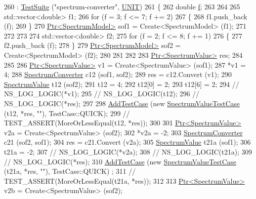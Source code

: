 \begin{DoxyCode}
260   : \hyperlink{classns3_1_1TestSuite_a904b0c40583b744d30908aeb94636d1a}{TestSuite} (\textcolor{stringliteral}{"spectrum-converter"}, \hyperlink{classns3_1_1TestSuite_a1ebfcab34ec8161e085e8e3a1855eae0a3885375a3787abf60431f8454b3cadbd}{UNIT})
261 \{
262   \textcolor{keywordtype}{double} \hyperlink{buildings__pathloss_8m_aa52d3a6e3de5a80a97c12364caeaa125}{f};
263 
264 
265   std::vector<double> f1;
266   \textcolor{keywordflow}{for} (f = 3; f <= 7; f += 2)
267     \{
268       f1.push\_back (f);
269     \}
270   \hyperlink{classns3_1_1Ptr}{Ptr<SpectrumModel>} sof1 = Create<SpectrumModel> (f1);
271 
272 
273 
274   std::vector<double> f2;
275   \textcolor{keywordflow}{for} (f = 2; f <= 8; f += 1)
276     \{
277       f2.push\_back (f);
278     \}
279   \hyperlink{classns3_1_1Ptr}{Ptr<SpectrumModel>} sof2 = Create<SpectrumModel> (f2);
280 
281 
282 
283   \hyperlink{classns3_1_1Ptr}{Ptr<SpectrumValue>} res;
284 
285 
286   \hyperlink{classns3_1_1Ptr}{Ptr<SpectrumValue>} v1 = Create<SpectrumValue> (sof1);
287   *v1 = 4;
288   \hyperlink{classns3_1_1SpectrumConverter}{SpectrumConverter} c12 (sof1, sof2);
289   res = c12.Convert (v1);
290   \hyperlink{classns3_1_1SpectrumValue}{SpectrumValue} t12 (sof2);
291   t12 = 4;
292   t12[0] = 2;
293   t12[6] = 2;
294 \textcolor{comment}{//   NS\_LOG\_LOGIC(*v1);}
295 \textcolor{comment}{//   NS\_LOG\_LOGIC(t12);}
296 \textcolor{comment}{//   NS\_LOG\_LOGIC(*res);}
297 
298   \hyperlink{classns3_1_1TestCase_a3718088e3eefd5d6454569d2e0ddd835}{AddTestCase} (\textcolor{keyword}{new} \hyperlink{classSpectrumValueTestCase}{SpectrumValueTestCase} (t12, *res, \textcolor{stringliteral}{""}), TestCase::QUICK);
299   \textcolor{comment}{// TEST\_ASSERT(MoreOrLessEqual(t12, *res));}
300 
301   \hyperlink{classns3_1_1Ptr}{Ptr<SpectrumValue>} v2a = Create<SpectrumValue> (sof2);
302   *v2a = -2;
303   \hyperlink{classns3_1_1SpectrumConverter}{SpectrumConverter} c21 (sof2, sof1);
304   res = c21.Convert (v2a);
305   \hyperlink{classns3_1_1SpectrumValue}{SpectrumValue} t21a (sof1);
306   t21a = -2;
307 \textcolor{comment}{//   NS\_LOG\_LOGIC(*v2a);}
308 \textcolor{comment}{//   NS\_LOG\_LOGIC(t21a);}
309 \textcolor{comment}{//   NS\_LOG\_LOGIC(*res);}
310   \hyperlink{classns3_1_1TestCase_a3718088e3eefd5d6454569d2e0ddd835}{AddTestCase} (\textcolor{keyword}{new} \hyperlink{classSpectrumValueTestCase}{SpectrumValueTestCase} (t21a, *res, \textcolor{stringliteral}{""}), TestCase::QUICK)
      ;
311   \textcolor{comment}{// TEST\_ASSERT(MoreOrLessEqual(t21a, *res));}
312 
313   \hyperlink{classns3_1_1Ptr}{Ptr<SpectrumValue>} v2b = Create<SpectrumValue> (sof2);

\end{DoxyCode}
